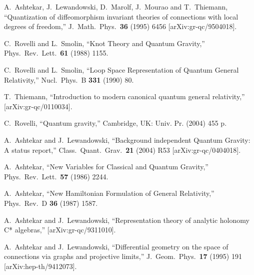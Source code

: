 \documentclass[12pt]{article}
\begin{document}
\begin{thebibliography}{99}
  A.~Ashtekar, J.~Lewandowski, D.~Marolf, J.~Mourao and T.~Thiemann,
   ``Quantization of diffeomorphism invariant theories of connections with local  degrees of freedom,''
  J.\ Math.\ Phys.\  {\bf 36} (1995) 6456
  [arXiv:gr-qc/9504018].




  C.~Rovelli and L.~Smolin,
  ``Knot Theory and Quantum Gravity,''
  Phys.\ Rev.\ Lett.\  {\bf 61} (1988) 1155.

  C.~Rovelli and L.~Smolin,
  ``Loop Space Representation of Quantum General Relativity,''
  Nucl.\ Phys.\  B {\bf 331} (1990) 80.


  T.~Thiemann,
  ``Introduction to modern canonical quantum general relativity,''
  [arXiv:gr-qc/0110034].




  C.~Rovelli,
  ``Quantum gravity,''
Cambridge, UK: Univ. Pr. (2004) 455 p.

  A.~Ashtekar and J.~Lewandowski,
  ``Background independent Quantum Gravity: A status report,''
  Class.\ Quant.\ Grav.\  {\bf 21} (2004) R53
  [arXiv:gr-qc/0404018].



  A.~Ashtekar,
  ``New Variables for Classical and Quantum Gravity,''
  Phys.\ Rev.\ Lett.\  {\bf 57} (1986) 2244.

  A.~Ashtekar,
  ``New Hamiltonian Formulation of General Relativity,''
  Phys.\ Rev.\  D {\bf 36} (1987) 1587.


A.~Ashtekar and J.~Lewandowski,
``Representation theory of analytic holonomy C* algebras,''
[arXiv:gr-qc/9311010].




  A.~Ashtekar and J.~Lewandowski,
 ``Differential geometry on the space of connections via graphs and projective
  limits,''
  J.\ Geom.\ Phys.\  {\bf 17} (1995) 191
  [arXiv:hep-th/9412073].



\end{thebibliography}
\end{document}
